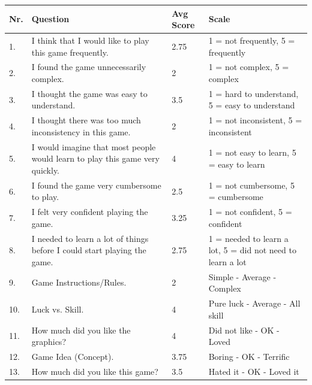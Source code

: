 	\begin{table}[H]
	\begin{tabular}{| l | p{5cm} | p{1cm} | p{5cm} |}
  		\hline
		\rowcolor{gray}
		{\bf Nr.} & {\bf Question} & {\bf Avg Score} & {\bf Scale} \\ \hline
		
		1. & I think that I would like to play this game frequently. & 2.75 & 1 = not frequently, 5 = frequently\\ \hline

		2. & I found the game unnecessarily complex. & 2 & 1 = not complex, 5 = complex \\ \hline

		3. & I thought the game was easy to understand. & 3.5 & 1 = hard to understand, 5 = easy to understand \\ \hline

		4. & I thought there was too much inconsistency in this game. & 2 & 1 = not inconsistent, 5 = inconsistent \\ \hline

		5. & I would imagine that most people would learn to play this game very quickly. & 4 & 1 = not easy to learn, 5 = easy to learn \\ \hline

		6. & I found the game very cumbersome to play. & 2.5 & 1 = not cumbersome, 5 = cumbersome \\ \hline

		7. & I felt very confident playing the game. & 3.25 & 1 = not confident, 5 = confident \\ \hline

		8. & I needed to learn a lot of things before I could start playing the game. & 2.75 & 1 = needed to learn a lot, 5 = did not need to learn a lot \\ \hline

		9. & Game Instructions/Rules. & 2 & Simple - Average - Complex \\ \hline

		10. & Luck vs. Skill. & 4 & Pure luck - Average - All skill \\ \hline

		11. & How much did you like the graphics? & 4 & Did not like - OK - Loved \\ \hline

		12. & Game Idea (Concept). & 3.75 & Boring - OK - Terrific \\ \hline

		13. & How much did you like this game? & 3.5 & Hated it - OK - Loved it \\ \hline


\end{tabular}
\end{table}
